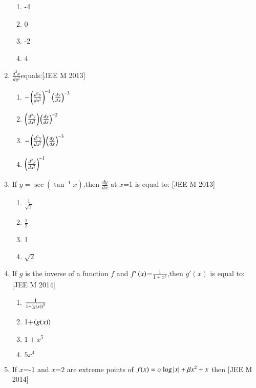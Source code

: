 \documentclass[journal,12pt,twocolumn]{IEEEtran}
\theoremstyle{remark}
\begin{document}
\begin{enumerate}
\begin{multicols}{4}
     
	    \begin{enumerate}
	\item -4
	\item 0
	\item -2
	\item 4
	    \end{enumerate}
     \end{multicols}
    \item $\frac{d^2x}{dy^2}$equals:\hfill[JEE M 2013]\break
    \begin{multicols}{2}
        
    
	    \begin{enumerate}
		    \item  $-\left({\frac{d^2y}{dx^2}}\right)^{-1}\left({\frac{dy}{dx}}\right)^{-3}$
		    \item $\left({\frac{d^2y}{dx^2}}\right)\left({\frac{dy}{dx}}\right)^{-2}$

		    \item $-\left({\frac{d^2y}{dx^2}}\right)\left({\frac{dy}{dx}}\right)^{-3}$
		    \item $\left(\frac{d^2y}{dx^2}\right)^{-1}$
	    \end{enumerate}
     \end{multicols}
    \item If $y=\sec(\tan^{-1}x)$,then $\frac{dy}{dx}$ at $x$=1 is equal to:
    \hfill[JEE M 2013]
\break
\begin{multicols}{2}
    

     \begin{enumerate}
     \item $\frac{1}{\sqrt{2}}$
     \item $\frac{1}{2}$
     \item 1
     \item $\sqrt{2}$
     \end{enumerate}
     \end{multicols}
      \item If $g$ is the inverse of a function $f$ and $f'\left(x\right)$=$\frac{1}{1+x^5}$,then $g'(x)$ is equal to:
      \hfill[JEE M 2014]\break
      \begin{multicols}{2}
          
      
      \begin{enumerate}
      \item $\frac{1}{1+\left({g(x)}\right)^5}$
      \item 1+$\left({g(x)}\right)$
      \item $1+x^5$
      \item $5x^4$
      \end{enumerate}
      \end{multicols}
      \item If $x$=-1 and $x$=2 are extreme points of $f(x)=\alpha\log\left\vert x\right\vert+\beta x^2+x$ then 
	      \hfill[JEE M 2014]
       \begin{multicols}{2}
           

\end{multicols}
\end{enumerate}
\end{document}
